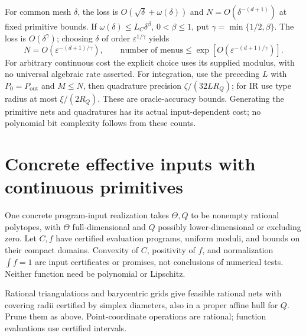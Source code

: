 \documentclass[11pt,a4paper]{article}
\numberwithin{equation}{section}
\begin{document}
For common mesh \(\delta\), the loss is
\(O(\sqrt\delta+\omega(\delta))\) and
\(N=O(\delta^{-(d+1)})\) at fixed primitive bounds.
If \(\omega(\delta)\le L_C\delta^\beta\), \(0<\beta\le1\), put
\(\gamma=\min\{1/2,\beta\}\).
The loss is \(O(\delta^\gamma)\); choosing
\(\delta\) of order \(\varepsilon^{1/\gamma}\) yields
\[
 N=O(\varepsilon^{-(d+1)/\gamma}),\qquad
 \text{number of menus}\le
 \exp[O(\varepsilon^{-(d+1)/\gamma})].
\]
For arbitrary continuous cost the explicit choice uses its supplied
modulus, with no universal algebraic rate asserted.
For integration, use the preceding \(L\) with \(P_0=P_{\mathrm{out}}\)
and \(M\le N\), then quadrature precision \(\zeta/(32LR_Q)\);
for IR use type radius at most \(\xi/(2R_Q)\).
These are oracle-accuracy bounds. Generating the primitive nets and
quadratures has its actual input-dependent cost; no polynomial bit
complexity follows from these counts.

\section{Concrete effective inputs with continuous primitives}\label{sec:concrete}
One concrete program-input realization takes \(\Theta,Q\) to be
nonempty rational polytopes, with \(\Theta\) full-dimensional and
\(Q\) possibly lower-dimensional or excluding zero.
Let \(C,f\) have certified evaluation programs, uniform moduli, and
bounds on their compact domains.
Convexity of \(C\), positivity of \(f\), and normalization
\(\int f=1\) are input certificates or promises, not conclusions
of numerical tests.
Neither function need be polynomial or Lipschitz.

Rational triangulations and barycentric grids give feasible rational
nets with covering radii certified by simplex diameters, also in a
proper affine hull for \(Q\). Prune them as above.
Point-coordinate operations are rational; function evaluations use
certified intervals.
\end{document}
